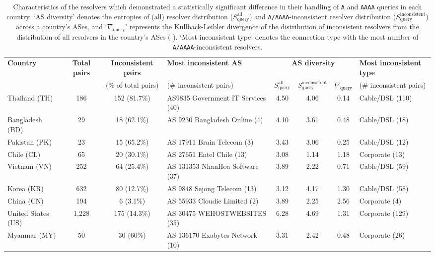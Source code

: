 \begin{table*}[t]
  \centering
  \small
  \scalebox{\tabularscale} {
    \begin{tabular}{lcclcccl}
    \toprule
      {\bf Country} & {\bf Total pairs} & {\bf Inconsistent pairs} & {\bf Most inconsistent AS} & \multicolumn{3}{c}{\bf AS diversity} & {\bf Most inconsistent type} \\ 
      & & {(\% of total pairs)}& {(\# inconsistent pairs)} & $S^{\text{all}}_{\text{query}}$ & $S^{\text{inconsistent}}_{\text{query}}$ & $\nabla_{\text{query}}$  & {(\# inconsistent pairs)} \\
      \midrule
      Thailand (TH)       & 186 & 152 (81.7\%)  &  AS9835 Government IT Services (40)  & 4.50 & 4.06 & 0.14 & Cable/DSL (110) \\
      Bangladesh (BD)     & 29  & 18 (62.1\%) & AS 9230 Bangladesh Online (4)          & 4.10 & 3.61 & 0.48 & Cable/DSL (18) \\    
      Pakistan (PK)       & 23  & 15 (65.2\%) & AS 17911 Brain Telecom (3)             & 3.43 & 3.06 & 0.25 & Cable/DSL (12) \\    
      Chile (CL)          & 65  & 20 (30.1\%) & AS 27651 Entel Chile (13)              & 3.08 & 1.14 & 1.18 & Corporate (13) \\    
      Vietnam (VN)        & 252 & 64 (25.4\%) & AS 131353 NhanHoa Software (37)        & 3.89 & 2.22 & 0.71 & Cable/DSL (59) \\    
      Korea (KR)          & 632 & 80 (12.7\%) & AS 9848 Sejong Telecom (13)            & 3.12 & 4.17 & 1.30 & Cable/DSL (58) \\    
      China (CN)          & 194 & 6 (3.1\%)   & AS 55933 Cloudie Limited (2)           & 3.89 & 2.25 & 2.56 & Corporate (4)   \\    
    \midrule
      United States (US)  & 1,228 & 175 (14.3\%)  & AS 30475 WEHOSTWEBSITES (35) & 6.28 & 4.69 & 1.31 & Corporate (129) \\    
      Myanmar (MY)        & 50  & 30 (60\%)   & AS 136170 Exabytes Network (10)  & 3.31 & 2.42 & 0.48 & Corporate (26) \\    
    \bottomrule
  \end{tabular}
  }
  \caption{Characteristics of the resolvers which demonstrated a statistically
  significant difference in their handling of {\tt A} and {\tt AAAA} queries in
  each country. 
  `AS diversity' denotes the entropies of (all) resolver distribution
  ($S^{\text{all}}_{\text{query}}$) and {\tt A/AAAA}-inconsistent resolver
  distribution ($S^{\text{inconsistent}}_{\text{query}}$) across a country's
  ASes, and `$\nabla_{\text{query}}$' represents the Kullback-Leibler
  divergence of the distribution of inconsistent resolvers from the
  distribution of all resolvers in the country's ASes (\cf
  ).
  `Most inconsistent type' denotes the connection type with the most number of
  {\tt A/AAAA}-inconsistent resolvers.}
  \label{tab:resources:resolvers}
\end{table*}

